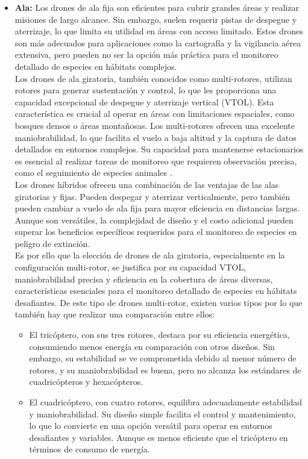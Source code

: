 \begin{itemize}
\item \textbf{Ala:}
Los drones de ala fija son eficientes para cubrir grandes áreas y realizar misiones de largo alcance. Sin embargo, suelen requerir pistas de despegue y aterrizaje, lo que limita su utilidad en áreas con acceso limitado. Estos drones son más adecuados para aplicaciones como la cartografía y la vigilancia aérea extensiva, pero pueden no ser la opción más práctica para el monitoreo detallado de especies en hábitats complejos.\\
Los drones de ala giratoria, también conocidos como multi-rotores, utilizan rotores para generar sustentación y control, lo que les proporciona una capacidad excepcional de despegue y aterrizaje vertical (VTOL). Esta característica es crucial al operar en áreas con limitaciones espaciales, como bosques densos o áreas montañosas. Los multi-rotores ofrecen una excelente maniobrabilidad, lo que facilita el vuelo a baja altitud y la captura de datos detallados en entornos complejos. Su capacidad para mantenerse estacionarios es esencial al realizar tareas de monitoreo que requieren observación precisa, como el seguimiento de especies animales \cite{tiposdrones}.\\
Los drones híbridos ofrecen una combinación de las ventajas de las alas giratorias y fijas. Pueden despegar y aterrizar verticalmente, pero también pueden cambiar a vuelo de ala fija para mayor eficiencia en distancias largas. Aunque son versátiles, la complejidad de diseño y el costo adicional pueden superar los beneficios específicos requeridos para el monitoreo de especies en peligro de extinción.\\
Es por ello que la elección de drones de ala giratoria, especialmente en la configuración multi-rotor, se justifica por su capacidad VTOL, maniobrabilidad precisa y eficiencia en la cobertura de áreas diversas, características esenciales para el monitoreo detallado de especies en hábitats desafiantes. De este tipo de drones multi-rotor, existen varios tipos por lo que también hay que realizar una comparación entre ellos:
\begin{itemize}[label=o]
\item El tricóptero, con sus tres rotores, destaca por su eficiencia energética, consumiendo menos energía en comparación con otros diseños. Sin embargo, su estabilidad se ve comprometida debido al menor número de rotores, y su maniobrabilidad es buena, pero no alcanza los estándares de cuadricópteros y hexacópteros.
\item El cuadricóptero, con cuatro rotores, equilibra adecuadamente estabilidad y maniobrabilidad. Su diseño simple facilita el control y mantenimiento, lo que lo convierte en una opción versátil para operar en entornos desafiantes y variables. Aunque es menos eficiente que el tricóptero en términos de consumo de energía.

\end{itemize}
\end{itemize}
